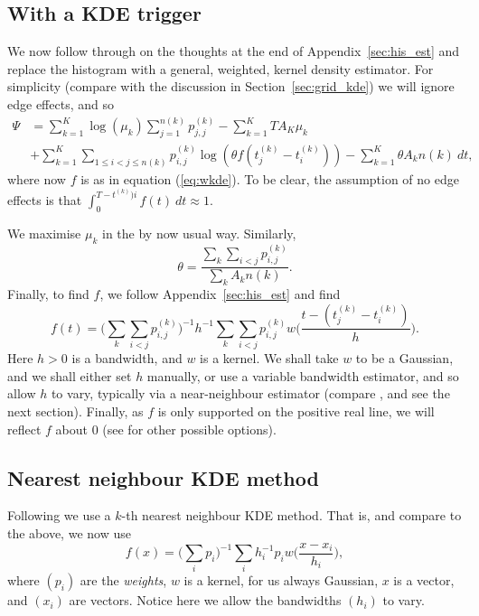 \documentclass[twoside,a4paper]{article}
\theoremstyle{plain}
\theoremstyle{definition}
\begin{document}
\subsection{With a KDE trigger}\label{app:grid_kde}

We now follow through on the thoughts at the end of Appendix~\ref{sec:his_est}
and replace the histogram with a general, weighted, kernel density estimator.
For simplicity (compare with the discussion in Section~\ref{sec:grid_kde}) we will
ignore edge effects, and so
\begin{align*}
\Psi &= \sum_{k=1}^K \log(\mu_k) \sum_{j=1}^{n(k)} p^{(k)}_{j,j}
  - \sum_{k=1}^K TA_K\mu_k \\
&+\sum_{k=1}^K \sum_{1\leq i<j\leq n(k)} p^{(k)}_{i,j} \log(\theta f(t^{(k)}_j - t^{(k)}_i))
- \sum_{k=1}^K \theta A_k n(k) \ dt,
\end{align*}
where now $f$ is as in equation (\ref{eq:wkde}).  To be clear, the assumption of
no edge effects is that $\int_0^{T-t^{(k)})i} f(t) \ dt \approx 1$.

We maximise $\mu_k$ in the by now usual way.  Similarly,
\[ \theta = \frac{\sum_k\sum_{i<j} p^{(k)}_{i,j}}{\sum_k A_k n(k)}. \]
Finally, to find $f$, we follow Appendix~\ref{sec:his_est} and find
\[ f(t) = \Big( \sum_k \sum_{i<j} p^{(k)}_{i,j} \Big)^{-1}
h^{-1} \sum_k \sum_{i<j} p^{(k)}_{i,j} w\Big( \frac{t - (t^{(k)}_j - t^{(k)}_i)}{h} \Big).
\]
Here $h>0$ is a bandwidth, and $w$ is a kernel.  We shall take $w$ to be a Gaussian, and we
shall either set $h$ manually, or use a variable bandwidth estimator, and so allow $h$ to
vary, typically via a near-neighbour estimator (compare \cite[Appendix]{sepp}, and see
the next section).
Finally, as $f$ is only supported on the positive real line, we will reflect $f$ about $0$
(see \cite[Section~2.10]{sil} for other possible options).


\subsection{Nearest neighbour KDE method}\label{app:knn_details}

Following \cite{sepp} we use a $k$-th nearest neighbour KDE method.  That is, and compare
to the above, we now use
\[ f(x) = \Big( \sum_i p_i \Big)^{-1}
\sum_i h_i^{-1} p_i w\Big( \frac{x - x_i}{h_i} \Big), \]
where $(p_i)$ are the \emph{weights}, $w$ is a kernel, for us always Gaussian, $x$
is a vector, and $(x_i)$ are vectors.  Notice here we allow the bandwidths $(h_i)$ to
vary.
\end{document}
